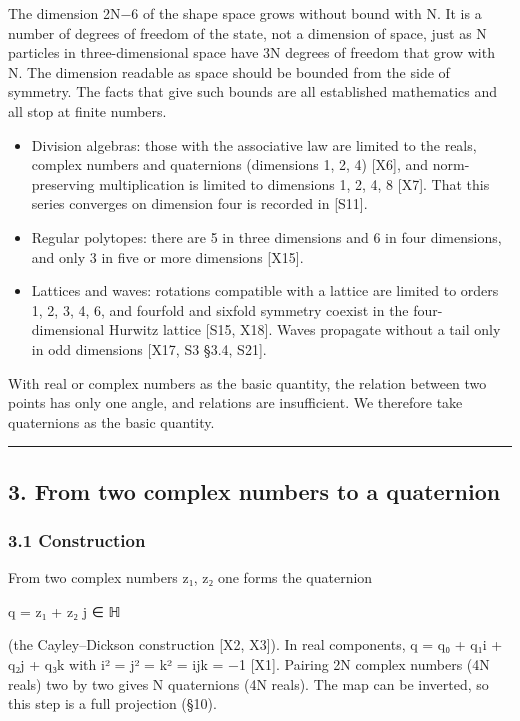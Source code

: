 \documentclass[
  a4paper,
]{article}
\providecommand{\tightlist}{%
  \setlength{\itemsep}{0pt}\setlength{\parskip}{0pt}}
\begin{document}
The dimension 2N−6 of the shape space grows without bound with N. It is
a number of degrees of freedom of the state, not a dimension of space,
just as N particles in three-dimensional space have 3N degrees of
freedom that grow with N. The dimension readable as space should be
bounded from the side of symmetry. The facts that give such bounds are
all established mathematics and all stop at finite numbers.

\begin{itemize}
\tightlist
\item
  Division algebras: those with the associative law are limited to the
  reals, complex numbers and quaternions (dimensions 1, 2, 4) {[}X6{]},
  and norm-preserving multiplication is limited to dimensions 1, 2, 4, 8
  {[}X7{]}. That this series converges on dimension four is recorded in
  {[}S11{]}.
\item
  Regular polytopes: there are 5 in three dimensions and 6 in four
  dimensions, and only 3 in five or more dimensions {[}X15{]}.
\item
  Lattices and waves: rotations compatible with a lattice are limited to
  orders 1, 2, 3, 4, 6, and fourfold and sixfold symmetry coexist in the
  four-dimensional Hurwitz lattice {[}S15, X18{]}. Waves propagate
  without a tail only in odd dimensions {[}X17, S3 §3.4, S21{]}.
\end{itemize}

With real or complex numbers as the basic quantity, the relation between
two points has only one angle, and relations are insufficient. We
therefore take quaternions as the basic quantity.

\begin{center}\rule{0.5\linewidth}{0.5pt}\end{center}

\subsection{3. From two complex numbers to a
quaternion}\label{from-two-complex-numbers-to-a-quaternion}

\subsubsection{3.1 Construction}\label{construction}

From two complex numbers z₁, z₂ one forms the quaternion

q = z₁ + z₂ j ∈ ℍ

(the Cayley--Dickson construction {[}X2, X3{]}). In real components, q =
q₀ + q₁i + q₂j + q₃k with i² = j² = k² = ijk = −1 {[}X1{]}. Pairing 2N
complex numbers (4N reals) two by two gives N quaternions (4N reals).
The map can be inverted, so this step is a full projection (§10).
\end{document}
